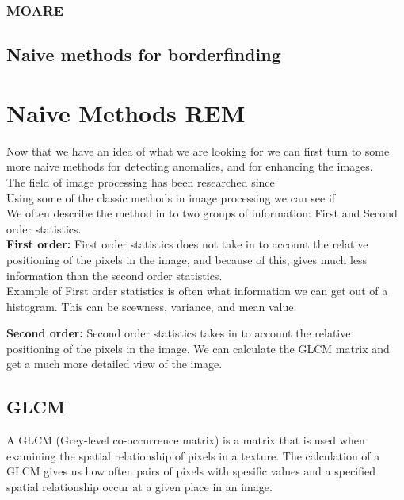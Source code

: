     \subsubsection{MOARE}
   \subsection{Naive methods for borderfinding}

%
%
\section{Naive Methods REM}
	  Now that we have an idea of what we are looking for we can first turn to some more naive methods for detecting anomalies, and for enhancing the images.\\
	  The field of image processing has been researched since\\ %
	  
	  Using some of the classic methods in image processing we can see if\\ %
	  
	  We often describe the method in to two groups of information: First and Second order statistics.\\
	  \textbf{First order:} First order statistics does not take in to account the relative positioning of the pixels in the image, and because of this, gives much less
	  information than the second order statistics.\\
	  Example of First order statistics is often what information we can get out of a histogram. This can be scewness, variance, and mean value.\\
	  
	  \vspace{10px}
	  
	  \textbf{Second order:} Second order statistics takes in to account the relative positioning of the pixels in the image. We can calculate the GLCM matrix and get a much more detailed 
	  view of the image. \\
	  
	  
	  
	  \subsection{GLCM}
	    A GLCM (Grey-level co-occurrence matrix) is a matrix that is used when examining the spatial relationship of pixels in a texture. 
	    The calculation of a GLCM gives us how often pairs of pixels with spesific values and a specified spatial relationship occur at a given place in an image. %
	  
